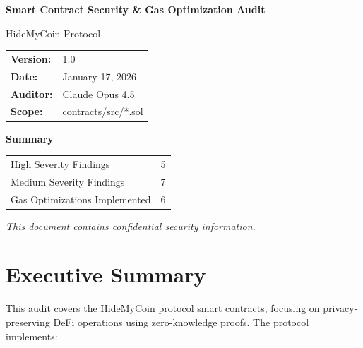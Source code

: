 \documentclass[11pt,a4paper]{article}
\begin{document}
\begin{titlepage}
    \centering
    \vspace*{2cm}

    {\Huge\bfseries Smart Contract Security \& Gas Optimization Audit\par}
    \vspace{1cm}
    {\LARGE HideMyCoin Protocol\par}
    \vspace{2cm}

    \begin{tabular}{ll}
        \textbf{Version:} & 1.0 \\
        \textbf{Date:} & January 17, 2026 \\
        \textbf{Auditor:} & Claude Opus 4.5 \\
        \textbf{Scope:} & contracts/src/*.sol \\
    \end{tabular}

    \vspace{3cm}

    \begin{tcolorbox}[colback=gray!10,colframe=gray!50!black,width=0.8\textwidth]
        \centering
        \textbf{Summary}\\[0.5em]
        \begin{tabular}{lc}
            High Severity Findings & 5 \\
            Medium Severity Findings & 7 \\
            Gas Optimizations Implemented & 6 \\
        \end{tabular}
    \end{tcolorbox}

    \vfill

    {\large\textit{This document contains confidential security information.}\par}
\end{titlepage}

\tableofcontents
\newpage

\section{Executive Summary}

This audit covers the HideMyCoin protocol smart contracts, focusing on privacy-preserving DeFi operations using zero-knowledge proofs. The protocol implements:
\end{document}
